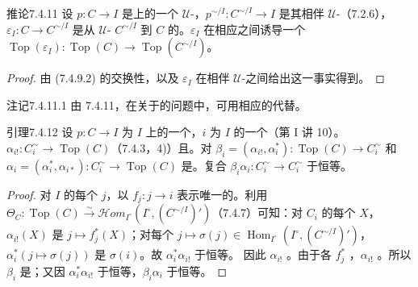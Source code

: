 \begin{SGAresult}{推论}{7.4.11}
设 $p:C\to I$ 是上的一个 $\mathcal U$-，$p^{\sim/I}:C^{\sim/I}\to I$ 是其相伴 $\mathcal U$-（7.2.6），$\varepsilon_I:C\to C^{\sim/I}$ 是从 $\mathcal U$- $C^{\sim/I}$ 到 $C$ 的。$\varepsilon_I$ 在相应之间诱导一个 $\operatorname{Top}(\varepsilon_I):\operatorname{Top}(C)\to\operatorname{Top}(C^{\sim/I})$。
\end{SGAresult}
\begin{proof}
由 (7.4.9.2) 的交换性，以及 $\varepsilon_I$ 在相伴 $\mathcal U$-之间给出这一事实得到。
\end{proof}
\begin{SGAresult}{注记}{7.4.11.1}
由 7.4.11，在关于的问题中，可用相应的代替。
\end{SGAresult}
\begin{SGAresult}{引理}{7.4.12}
设 $p:C\to I$ 为 $I$ 上的一个，$i$ 为 $I$ 的一个（第 I 讲 10）。 $\alpha_{i!}:C_i^\sim\to\operatorname{Top}(C)$（7.4.3，4)）且。对 $\beta_i=(\alpha_{i!},\alpha_i^*):\operatorname{Top}(C)\to C_i^\sim$ 和 $\alpha_i=(\alpha_i^*,\alpha_{i*}):C_i^\sim\to\operatorname{Top}(C)$ 是。复合 $\beta_i\alpha_i:C_i^\sim\to C_i^\sim$ 于恒等。
\end{SGAresult}
\begin{proof}
对 $I$ 的每个 $j$，以 $f_j:j\to i$ 表示唯一的。利用 $\Theta_C:\operatorname{Top}(C)\xrightarrow\sim\mathscr{H}\!om_{I^\circ}(I^\circ,(C^{\sim/I})')$（7.4.7）可知：对 $C_i$ 的每个 $X$，$\alpha_{i!}(X)$ 是 $j\mapsto f_j^*(X)$；对每个 $j\mapsto\sigma(j)\in\operatorname{Hom}_{I^\circ}(I^\circ,(C^{\sim/I})')$，$\alpha_i^*(j\mapsto\sigma(j))$ 是 $\sigma(i)$。故 $\alpha_i^*\alpha_{i!}$ 于恒等。
因此 $\alpha_{i!}$ 。由于各 $f_j^*$ ，$\alpha_{i!}$ 。所以 $\beta_i$ 是；又因 $\alpha_i^*\alpha_{i!}$ 于恒等，$\beta_i\alpha_i$ 于恒等。
\end{proof}
